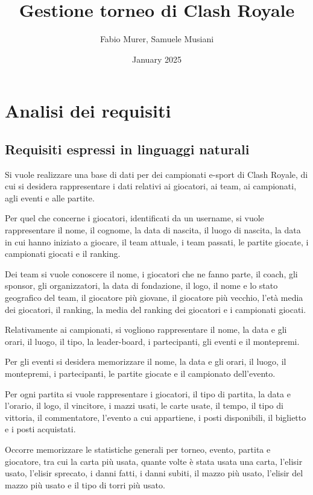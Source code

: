\documentclass{article}
\title{\textbf{Gestione torneo di Clash Royale}}
\author{Fabio Murer, Samuele Musiani}
\date{January 2025}
\begin{document}
\maketitle

\section{Analisi dei requisiti}

\subsection{Requisiti espressi in linguaggi naturali}
Si vuole realizzare una base di dati per dei campionati e-sport di Clash Royale, di cui si desidera rappresentare i dati relativi ai giocatori, ai team, ai campionati, agli eventi e alle partite.

Per quel che concerne i giocatori, identificati da un username, si vuole rappresentare il nome, il cognome, la data di nascita, il luogo di nascita, la data in cui hanno iniziato a giocare, il team attuale, i team passati, le partite giocate, i campionati giocati e il ranking.

Dei team si vuole conoscere il nome, i giocatori che ne fanno parte, il coach, gli sponsor, gli organizzatori, la data di fondazione, il logo, il nome e lo stato geografico del team, il giocatore più giovane, il giocatore più vecchio, l'età media dei giocatori, il ranking, la media del ranking dei giocatori e i campionati giocati.

Relativamente ai campionati, si vogliono rappresentare il nome, la data e gli orari, il luogo, il tipo, la leader-board, i partecipanti, gli eventi e il montepremi.

Per gli eventi si desidera memorizzare il nome, la data e gli orari, il luogo, il montepremi, i partecipanti, le partite giocate e il campionato dell'evento.

Per ogni partita si vuole rappresentare i giocatori, il tipo di partita, la data e l'orario, il logo, il vincitore, i mazzi usati, le carte usate, il tempo, il tipo di vittoria, il commentatore, l'evento a cui appartiene, i posti disponibili, il biglietto e i posti acquistati.

Occorre memorizzare le statistiche generali per torneo, evento, partita e giocatore, tra cui la carta più usata, quante volte è stata usata una carta, l'elisir usato, l'elisir sprecato, i danni fatti, i danni subiti, il mazzo più usato, l'elisir del mazzo più usato e il tipo di torri più usato. 
\end{document}
